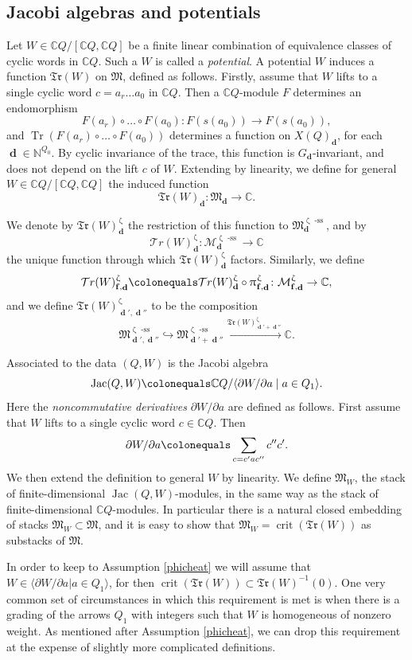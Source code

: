 \documentclass[a4paper,10pt]{amsart}
\renewcommand{\zeta}{\upzeta}
\renewcommand{\pi}{\uppi\hspace{0.05em}}
\newcommand{\ff}{\mathbf{f}}
\newcommand{\WW}{\mathcal{T}r(W)}
\newcommand{\WWW}{\mathfrak{Tr}(W)}
\newcommand{\Mst}{\mathfrak{M}}
\newcommand{\Msp}{\mathcal{M}}
\DeclareMathOperator{\sst}{-ss}
\DeclareMathOperator{\crit}{crit}
\DeclareMathOperator{\dd}{\mathbf{d}}
\DeclareMathOperator{\Jac}{Jac}
\DeclareMathOperator{\Tr}{Tr}
\begin{document}
\subsection{Jacobi algebras and potentials}
Let $W\in\mathbb{C} Q/[\mathbb{C}Q,\mathbb{C}Q]$ be a finite linear combination of equivalence classes of cyclic words in $\mathbb{C} Q$.  Such a $W$ is called a \textit{potential}.  A potential $W$ induces a function $\WWW$ on $\Mst$, defined as follows.  Firstly, assume that $W$ lifts to a single cyclic word $c=a_r\ldots a_0$ in $\mathbb{C} Q$.  Then a $\mathbb{C}Q$-module $F$ determines an endomorphism 
\[
F(a_r)\circ\ldots\circ F(a_0)\colon F(s(a_0))\rightarrow F(s(a_0)), 
\]
and $\Tr(F(a_r)\circ\ldots\circ F(a_0))$ determines a function on $X(Q)_{\dd}$, for each $\dd\in\mathbb{N}^{Q_0}$.  By cyclic invariance of the trace, this function is $G_{\dd}$-invariant, and does not depend on the lift $c$ of $W$.  Extending by linearity, we define for general $W\in\mathbb{C}Q/[\mathbb{C}Q,\mathbb{C}Q]$ the induced function 
\[
\WWW_{\dd}\colon \Mst_{\dd}\rightarrow \mathbb{C}.  
\]

We denote by $\WWW_{\dd}^{\zeta}$ the restriction of this function to $\Mst^{\zeta\sst}_{\dd}$, and by 
\[
\WW^{\zeta}_{\dd}\colon \Msp^{\zeta\sst}_{\dd}\rightarrow\mathbb{C}
\]
the unique function through which $\WWW^{\zeta}_{\dd}$ factors.  Similarly, we define 
\[
\WW_{\ff,\dd}^{\zeta}\colonequals \WW_{\dd}^{\zeta}\circ\pi_{\ff,\dd}^{\zeta}\colon \Msp_{\ff,\dd}^{\zeta}\rightarrow \mathbb{C},
\]
and we define $\WWW_{\dd',\dd''}^{\zeta}$ to be the composition 
\[
\Mst_{\dd',\dd''}^{\zeta\sst}\hookrightarrow\Mst_{\dd'+\dd''}^{\zeta\sst}\xrightarrow{\WWW_{\dd'+\dd''}^{\zeta}}\mathbb{C}.
\]

Associated to the data $(Q,W)$ is the Jacobi algebra 
\[
\Jac(Q,W)\colonequals \mathbb{C} Q/\langle \partial W/\partial a\;|\;a\in Q_1\rangle.  
\]
Here the \textit{noncommutative derivatives} $\partial W/\partial a$ are defined as follows.  First assume that $W$ lifts to a single cyclic word $c\in\mathbb{C}Q$.  Then 
\[
\partial W/\partial a\colonequals \sum_{c=c'ac''}c''c'.
\]
We then extend the definition to general $W$ by linearity.  We define $\Mst_{W}$, the stack of finite-dimensional $\Jac(Q,W)$-modules, in the same way as the stack of finite-dimensional $\mathbb{C} Q$-modules.  In particular there is a natural closed embedding of stacks $\Mst_W\subset \Mst$, and it is easy to show that $\Mst_W=\crit(\WWW)$ as substacks of $\Mst$.  

In order to keep to Assumption \ref{phicheat} we will assume that $W\in \langle \partial W/\partial a|a\in Q_1\rangle$, for then $\crit(\WWW)\subset\WWW^{-1}(0)$.  One very common set of circumstances in which this requirement is met is when there is a grading of the arrows $Q_1$ with integers such that $W$ is homogeneous of nonzero weight.  As mentioned after Assumption \ref{phicheat}, we can drop this requirement at the expense of slightly more complicated definitions.
\end{document}
